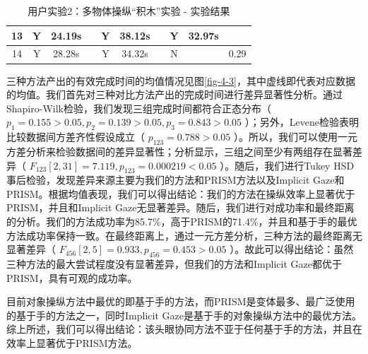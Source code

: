 \begin{table}[t!]
\begin{tabular}{|c|ccc|ccc|ccc|}
   \\ \hline
13 &
  \multicolumn{1}{c|}{Y} &
  \multicolumn{1}{c|}{24.19s} &
   &
  \multicolumn{1}{c|}{Y} &
  \multicolumn{1}{c|}{38.12s} &
   &
  \multicolumn{1}{c|}{Y} &
  \multicolumn{1}{c|}{32.97s} &
   \\ \hline
14 &
  \multicolumn{1}{c|}{Y} &
  \multicolumn{1}{c|}{28.28s} &
   &
  \multicolumn{1}{c|}{Y} &
  \multicolumn{1}{c|}{34.32s} &
   &
  \multicolumn{1}{c|}{N} &
  \multicolumn{1}{c|}{} &
  0.29 \\ \hline
\end{tabular}
\caption{用户实验2：多物体操纵“积木”实验 - 实验结果}
\label{table-4-5}
\end{table}

三种方法产出的有效完成时间的均值情况见图\ref{fig-4-3}，其中虚线即代表对应数据的均值。我们首先对三种对比方法产出的完成时间进行差异显著性分析。通过Shapiro-Wilk检验，我们发现三组完成时间都符合正态分布（ $p_1 = 0.155 > 0.05, p_2 = 0.139 > 0.05, p_3 = 0.843 > 0.05$ ）；另外，Levene检验表明比较数据间方差齐性假设成立（ $p_{123} = 0.788 > 0.05$ ）。所以，我们可以使用一元方差分析来检验数据间的差异显著性；分析显示，三组之间至少有两组存在显著差异（ $F_{123}[2, 31] = 7.119, p_{123} = 0.000219 < 0.05$ ）。随后，我们进行Tukey HSD事后检验，发现差异来源主要为我们的方法和PRISM方法以及Implicit Gaze和PRISM。根据均值表现，我们可以得出结论：我们的方法在操纵效率上显著优于PRISM，并且和Implicit Gaze无显著差异。随后，我们进行对成功率和最终距离的分析。我们的方法成功率为85.7\%，高于PRISM的71.4\%，并且和基于手的最优方法成功率保持一致。在最终距离上，通过一元方差分析，三种方法的最终距离无显著差异（ $F_{456}[2, 5] = 0.933, p_{456} = 0.453 > 0.05$ ）。故此可以得出结论：虽然三种方法的最大尝试程度没有显著差异，但我们的方法和Implicit Gaze都优于PRISM，具有可观的成功率。

目前对象操纵方法中最优的即基于手的方法，而PRISM是变体最多、最广泛使用的基于手的方法之一，同时Implicit Gaze是基于手的对象操纵方法中的最优方法。综上所述，我们可以得出结论：该头眼协同方法不亚于任何基于手的方法，并且在效率上显著优于PRISM方法。

